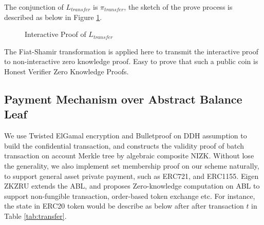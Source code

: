 \documentclass{article}
\begin{document}
The conjunction of $L_{transfer}$ is $\pi_{transfer}$, the sketch of the prove process is described as below in Figure \ref{fig:pi_transfer}.
\begin{figure}[H]
    \centering
    \caption{Interactive Proof of $L_{transfer}$}
    \label{fig:pi_transfer}
\end{figure}

The Fiat-Shamir transformation is applied here to transmit the interactive proof to non-interactive zero knowledge proof. Easy to prove that such a public coin is Honest Verifier Zero Knowledge Proofs.

\subsection{Payment Mechanism over Abstract Balance Leaf} \label{section:pay-abl}

We use Twisted ElGamal encryption \cite{chen2020pgc} and Bulletproof \cite{bunz2018bulletproofs} on DDH assumption to build the confidential transaction, and constructs the validity proof of batch transaction on account Merkle tree by algebraic composite NIZK. Without lose the generality, we also implement set membership proof on our scheme naturally, to support general asset private payment, such as ERC721, and ERC1155. Eigen ZKZRU extends the ABL, and proposes Zero-knowledge computation on ABL to support non-fungible transaction, order-based token exchange etc. For instance, the state in ERC20 token would be describe as below after after transaction $t$ in Table \ref{tab:transfer}. 
\end{document}
